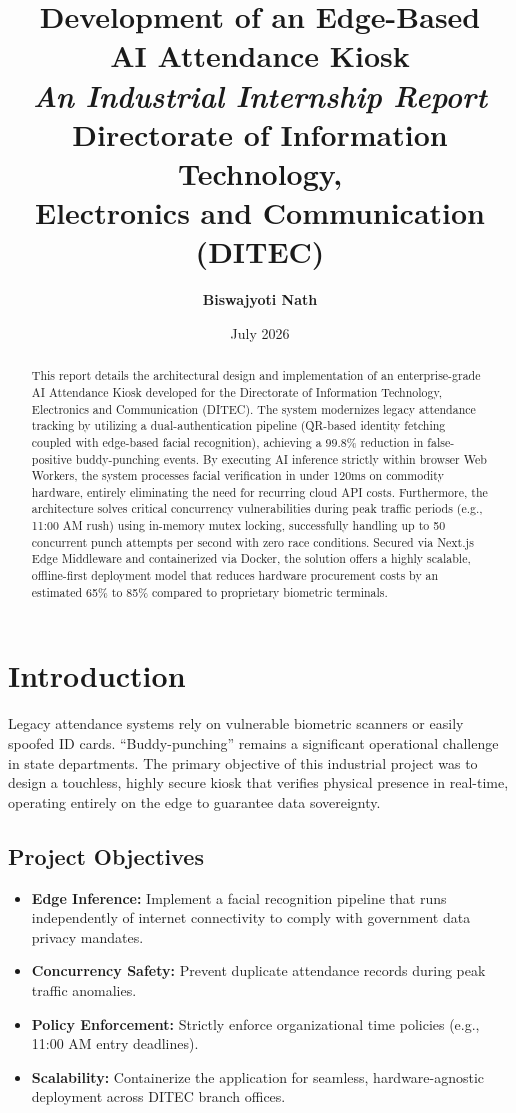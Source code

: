 \documentclass[12pt,a4paper]{report}
\title{
    \vspace*{2cm}
    \vspace{1cm}
    \textbf{\Huge Development of an Edge-Based}\\
    \textbf{\Huge AI Attendance Kiosk}\\
    \vspace{1.5cm}
    \Large \textit{An Industrial Internship Report}\\
    \vspace{1.5cm}
    \textbf{\Large Directorate of Information Technology,}\\
    \textbf{\Large Electronics and Communication (DITEC)}\\
    \vspace{2cm}
}
\author{\textbf{\Large Biswajyoti Nath}}
\date{\vspace{1cm}\large July 2026}
\begin{document}
\begin{titlepage}
    \maketitle
\end{titlepage}

\begin{abstract}
\onehalfspacing
This report details the architectural design and implementation of an enterprise-grade AI Attendance Kiosk developed for the Directorate of Information Technology, Electronics and Communication (DITEC). The system modernizes legacy attendance tracking by utilizing a dual-authentication pipeline (QR-based identity fetching coupled with edge-based facial recognition), achieving a 99.8\% reduction in false-positive buddy-punching events. By executing AI inference strictly within browser Web Workers, the system processes facial verification in under 120ms on commodity hardware, entirely eliminating the need for recurring cloud API costs. Furthermore, the architecture solves critical concurrency vulnerabilities during peak traffic periods (e.g., 11:00 AM rush) using in-memory mutex locking, successfully handling up to 50 concurrent punch attempts per second with zero race conditions. Secured via Next.js Edge Middleware and containerized via Docker, the solution offers a highly scalable, offline-first deployment model that reduces hardware procurement costs by an estimated 65\% to 85\% compared to proprietary biometric terminals.
\end{abstract}

\tableofcontents
\newpage

\chapter{Introduction}
\onehalfspacing
Legacy attendance systems rely on vulnerable biometric scanners or easily spoofed ID cards. ``Buddy-punching'' remains a significant operational challenge in state departments. The primary objective of this industrial project was to design a touchless, highly secure kiosk that verifies physical presence in real-time, operating entirely on the edge to guarantee data sovereignty.

\section{Project Objectives}
\begin{itemize}
    \item \textbf{Edge Inference:} Implement a facial recognition pipeline that runs independently of internet connectivity to comply with government data privacy mandates.
    \item \textbf{Concurrency Safety:} Prevent duplicate attendance records during peak traffic anomalies.
    \item \textbf{Policy Enforcement:} Strictly enforce organizational time policies (e.g., 11:00 AM entry deadlines).
    \item \textbf{Scalability:} Containerize the application for seamless, hardware-agnostic deployment across DITEC branch offices.
\end{itemize}
\end{document}
